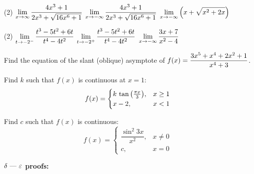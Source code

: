 \documentclass[answers]{exam}
\begin{document}
  \begin{tasks}[label=\hspace*{0pt}, after-item-skip=\stretch{1}](2)
    \task $\displaystyle\lim_{x\to \infty} \frac{4x^3+1}{2x^3+\sqrt{16x^6+1}}$
    \task $\displaystyle\lim_{x\to -\infty} \frac{4x^3+1}{2x^3+\sqrt{16x^6+1}}$
    \task $\displaystyle\lim_{x\to -\infty} {\left(x+\sqrt{x^2+2x}\right)}$
  \end{tasks}
  \pagebreak
  
  \begin{tasks}[label=\hspace*{0pt}, after-item-skip=\stretch{1}](2)
    \task $\displaystyle\lim_{t\to -2^-} \frac{t^3-5t^2+6t}{t^4-4t^2}$
    \task $\displaystyle\lim_{t\to -2^+} \frac{t^3-5t^2+6t}{t^4-4t^2}$
    \task $\displaystyle\lim_{x\to -\infty} \frac{3x+7}{x^2-4}$
  \end{tasks}
  \pagebreak
  
  Find the equation of the slant (oblique) asymptote of $\displaystyle f(x)=\frac{3x^5+x^4+2x^2+1}{x^4+3}$.
  \pagebreak
  
  Find $k$ such that $f(x)$ is continuous at $x=1$:
    $$f(x)=\begin{cases}
      k\,\tan{\left(\frac{\pi x}{3}\right)},& x\geq 1\\
      x-2,& x<1
    \end{cases}$$
  
  Find $c$ such that $f(x)$ is continuous:
    $$f(x)=\begin{cases}
      \dfrac{\sin^2 3x}{x^2},& x\neq 0\\
      c,& x=0
    \end{cases}$$
  \pagebreak 
  
\textbf{$\delta \textnormal{ --- } \varepsilon$ proofs:}
\end{document}
